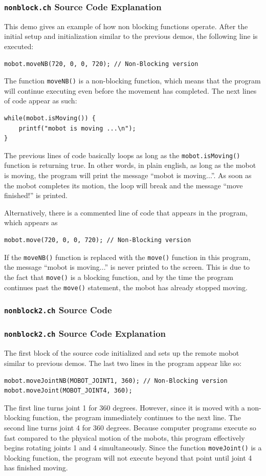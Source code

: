 \documentclass{article}
\begin{document}
\subsubsection{\texttt{nonblock.ch} Source Code Explanation}
This demo gives an example of how non blocking functions operate. 
After the initial setup and initialization similar to the previous
demos, the following line is executed:
\begin{verbatim}
mobot.moveNB(720, 0, 0, 720); // Non-Blocking version
\end{verbatim}
The function \texttt{moveNB()} is a non-blocking function, which means
that the program will continue executing even before the movement
has completed. The next lines of code appear as such:
\begin{verbatim}
while(mobot.isMoving()) {
    printf("mobot is moving ...\n");
}
\end{verbatim}
The previous lines of code basically loops as long as the \texttt{mobot.isMoving()} function
is returning true. In other words, in plain english, as long as the mobot is moving,
the program will print the message ``mobot is moving...''. As soon as the mobot completes
its motion, the loop will break and the message ``move finished!'' is printed.

Alternatively, there is a commented line of code that appears in the program, which
appears as
\begin{verbatim}
mobot.move(720, 0, 0, 720); // Non-Blocking version
\end{verbatim}
If the \texttt{moveNB()} function is replaced with the \texttt{move()} function in this program,
the message ``mobot is moving...'' is never printed to the screen. This is due to the
fact that \texttt{move()} is a blocking function, and by the time the program continues past
the \texttt{move()} statement, the mobot has already stopped moving.

\subsubsection{\texttt{nonblock2.ch} Source Code}

\subsubsection{\texttt{nonblock2.ch} Source Code Explanation}
The first block of the source code initialized and sets up the remote mobot 
similar to previous demos. The last two lines in the program appear like so:
\begin{verbatim}
mobot.moveJointNB(MOBOT_JOINT1, 360); // Non-Blocking version
mobot.moveJoint(MOBOT_JOINT4, 360);
\end{verbatim}
The first line turns joint 1 for 360 degrees. However, since it is moved with a non-blocking function,
the program immediately continues to the next line. The second line turns joint 4 for
360 degrees. Because computer programs execute so fast compared to the physical
motion of the mobots, this program effectively begins rotating joints 1 and 4 
simultaneously. Since the function \texttt{moveJoint()} is a blocking function,
the program will not execute beyond that point until joint 4 has finished moving.
\end{document}
